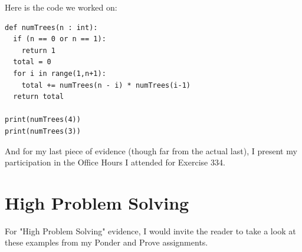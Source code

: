 \documentclass[11pt]{article}
\begin{document}
Here is the code we worked on:

\begin{verbatim}
def numTrees(n : int):
  if (n == 0 or n == 1):
    return 1
  total = 0
  for i in range(1,n+1):
    total += numTrees(n - i) * numTrees(i-1)
  return total

print(numTrees(4))
print(numTrees(3))
\end{verbatim}

And for my last piece of evidence (though far from the actual last), I present my participation in
the Office Hours I attended for Exercise 334.

\section{High Problem Solving}
\label{sec:orgbe8b598}
For "High Problem Solving" evidence, I would invite the reader to take a look at these examples from
my Ponder and Prove assignments.
\end{document}
